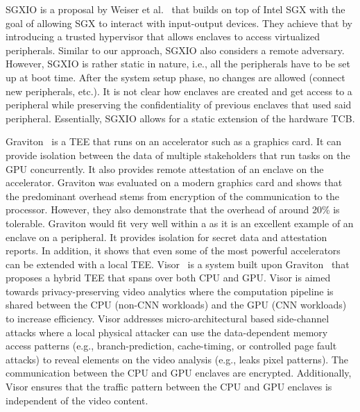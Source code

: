 \setcounter{para}{0}


%     

\iffalse
\setcounter{para}{0}
 SGXIO is a proposal by Weiser et al.~\cite{weiser2017sgxio} that builds on top of Intel SGX with the goal of allowing SGX to interact with input-output devices. They achieve that by introducing a trusted hypervisor that allows enclaves to access virtualized peripherals. Similar to our approach, SGXIO also considers a remote adversary. However, SGXIO is rather static in nature, i.e., all the peripherals have to be set up at boot time. After the system setup phase, no changes are allowed (connect new peripherals, etc.). It is not clear how enclaves are created and get access to a peripheral while preserving the confidentiality of previous enclaves that used said peripheral. Essentially, SGXIO allows for a static extension of the hardware TCB.

 Graviton~\cite{volos2018graviton} is a TEE that runs on an accelerator such as a graphics card. It can provide isolation between the data of multiple stakeholders that run tasks on the GPU concurrently. It also provides remote attestation of an enclave on the accelerator. Graviton was evaluated on a modern graphics card and shows that the predominant overhead stems from encryption of the communication to the processor. However, they also demonstrate that the overhead of around 20\% is tolerable. Graviton would fit very well within a \name{} as it is an excellent example of an enclave on a peripheral. It provides isolation for secret data and attestation reports. In addition, it shows that even some of the most powerful accelerators can be extended with a local TEE. Visor~\cite{visor} is a system built upon Graviton~\cite{volos2018graviton} that proposes a hybrid TEE that spans over both CPU and GPU. Visor is aimed towards privacy-preserving video analytics where the computation pipeline is shared between the CPU (non-CNN workloads) and the GPU (CNN workloads) to increase efficiency. Visor addresses micro-architectural based side-channel attacks where a local physical attacker can use the data-dependent memory access patterns (e.g., branch-prediction, cache-timing, or controlled page fault attacks) to reveal elements on the video analysis (e.g., leaks pixel patterns). The communication between the CPU and GPU enclaves are encrypted. Additionally, Visor ensures that the traffic pattern between the CPU and GPU enclaves is independent of the video content.

